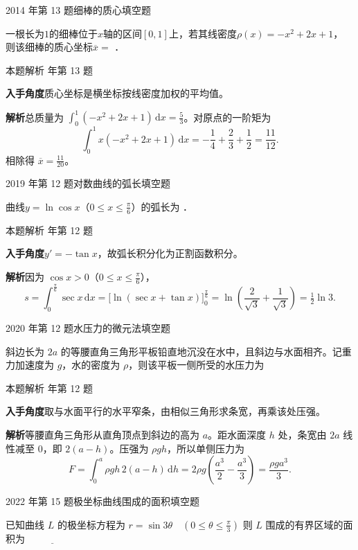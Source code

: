 \documentclass[UTF8,zihao=-4,fontset=fandol]{ctexart}
\newcommand{\blank}{\underline{\hspace{5em}}}
\newcommand{\QuestionPage}[6]{%
  \par\noindent\begin{minipage}{\linewidth}
  \raggedright
  {\small\textcolor{black!60}{#3\quad #5}\hfill\textcolor{accent}{#2}}\par\smallskip}
\newcommand{\QuestionEnd}{\end{minipage}\par\medskip}
\newcommand{\QuestionPage}[6]{%
  \clearpage
  {\small\textcolor{accent}{#1\hfill #2}}\par\medskip
  {\small\textcolor{black!60}{#3\quad #5\hfill #6}}\par\vspace{9bp}}
\newcommand{\QuestionEnd}{}
\newenvironment{QuestionSolution}[1]{%
  \clearpage
  {\small\textcolor{black!60}{本题解析\quad #1}}\par\medskip
}{\par\clearpage}
\begin{document}
\QuestionPage{3.4 定积分的应用}{填空题}{2014 年第 13 题}{2}{细棒的质心}{170 / 234}
一根长为$1$的细棒位于$x$轴的区间$[0,1]$上，若其线密度$\rho (x) = - x^2 + 2x + 1$，
则该细棒的质心坐标$\overline{x} =$ \blank{}．
\QuestionEnd

\begin{QuestionSolution}{2014 年第 13 题}
\textbf{入手角度}\quad 质心坐标是横坐标按线密度加权的平均值。

\textbf{解析}\quad 总质量为 \(\int_0^1(-x^2+2x+1)\,\mathrm{d}x=\frac{5}{3}\)。对原点的一阶矩为
\[
\int_0^1x(-x^2+2x+1)\,\mathrm{d}x=-\frac14+\frac23+\frac12=\frac{11}{12}.
\]
相除得 \(\overline{x}=\boxed{\frac{11}{20}}\)。
\end{QuestionSolution}

\QuestionPage{3.4 定积分的应用}{填空题}{2019 年第 12 题}{2}{对数曲线的弧长}{171 / 234}
曲线$y = \ln \cos x$（$0 \le x \le \frac{\pi}{6}$）的弧长为 \blank{}．
\QuestionEnd

\begin{QuestionSolution}{2019 年第 12 题}
\textbf{入手角度}\quad \(y'=-\tan x\)，故弧长积分化为正割函数积分。

\textbf{解析}\quad 因为 \(\cos x>0\)（\(0\le x\le\frac{\pi}{6}\)），
\[
s=\int_0^{\frac{\pi}{6}}\sec x\,\mathrm{d}x
=\bigl[\ln(\sec x+\tan x)\bigr]_0^{\frac{\pi}{6}}
=\ln\left(\frac2{\sqrt3}+\frac1{\sqrt3}\right)
=\boxed{\tfrac12\ln3}.
\]
\end{QuestionSolution}

\QuestionPage{3.4 定积分的应用}{填空题}{2020 年第 12 题}{2}{水压力的微元法}{172 / 234}
斜边长为 \(2a\) 的等腰直角三角形平板铅直地沉没在水中，且斜边与水面相齐。记重力加速度为 \(g\)，水的密度为 \(\rho\)，则该平板一侧所受的水压力为
\blank{}
\QuestionEnd

\begin{QuestionSolution}{2020 年第 12 题}
\textbf{入手角度}\quad 取与水面平行的水平窄条，由相似三角形求条宽，再乘该处压强。

\textbf{解析}\quad 等腰直角三角形从直角顶点到斜边的高为 \(a\)。距水面深度 \(h\) 处，条宽由 \(2a\) 线性减至 \(0\)，即 \(2(a-h)\)。压强为 \(\rho gh\)，所以单侧压力为
\[
F=\int_0^a \rho gh\,2(a-h)\,\mathrm{d}h
=2\rho g\left(\frac{a^3}{2}-\frac{a^3}{3}\right)
=\boxed{\frac{\rho ga^3}{3}}.
\]
\end{QuestionSolution}

\QuestionPage{3.4 定积分的应用}{填空题}{2022 年第 15 题}{2}{极坐标曲线围成的面积}{173 / 234}
已知曲线 \(L\) 的极坐标方程为
\(r = \sin 3\theta \quad \left( 0 \le \theta \le \frac{\pi}{3} \right)\)
则 \(L\) 围成的有界区域的面积为 \(\blank{}\)
\QuestionEnd
\end{document}
